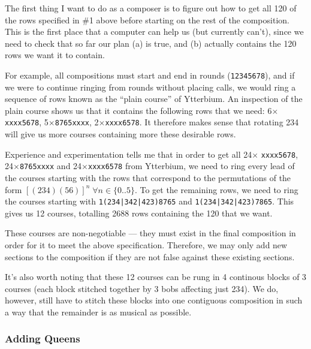 \documentclass[12pt]{article}
\newcommand{\row}[1]{\texttt{#1}}
\begin{document}
The first thing I want to do as a composer is to figure out how to get all 120 of the rows specified
in \#1 above before starting on the rest of the composition.  This is the first place that a computer
can help us (but currently can't), since we need to check that so far our plan (a) is true, and (b)
actually contains the 120 rows we want it to contain.

For example, all compositions must start and end in rounds (\row{12345678}), and if we were to
continue ringing from rounds without placing calls, we would ring a sequence of rows known as the
``plain course'' of Ytterbium.  An inspection of the plain course shows us that it contains the
following rows that we need: 6$\times$\row{xxxx5678}, 5$\times$\row{8765xxxx},
2$\times$\row{xxxx6578}.  It therefore makes sense that rotating 234 will give us more courses
containing more these desirable rows.

Experience and experimentation tells me that in order to get all 24$\times$ \row{xxxx5678},
24$\times$\row{8765xxxx} and 24$\times$\row{xxxx6578} from Ytterbium, we need to ring every lead of
the courses starting with the rows that correspond to the permutations of the form
${[(234)(56)]}^n \; \forall n \in \{0..5\}$.  To get the remaining rows, we need to ring the
courses starting with \row{1(234|342|423)8765} and \row{1(234|342|423)7865}.  This gives us 12
courses, totalling 2688 rows containing the 120 that we want.

These courses are non-negotiable --- they must exist in the final composition in order for it to
meet the above specification.  Therefore, we may only add new sections to the composition if they
are not false against these existing sections.

It's also worth noting that these 12 courses can be rung in 4 continous blocks of 3 courses (each
block stitched together by 3 bobs affecting just 234).  We do, however, still have to stitch these
blocks into one contiguous composition in such a way that the remainder is as musical as possible.

\subsubsection{Adding Queens}
\end{document}
